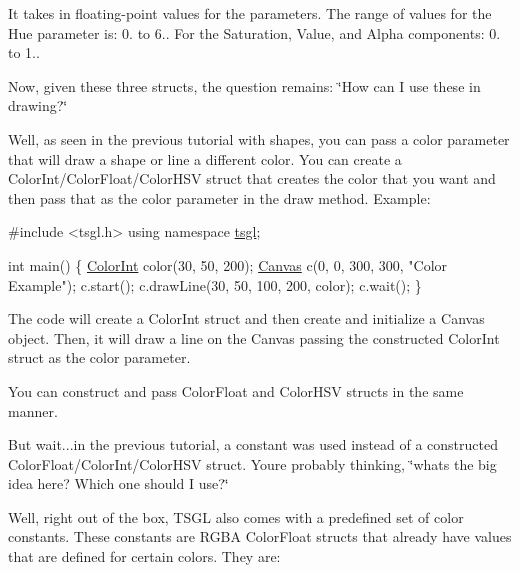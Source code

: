 It takes in floating-\/point values for the parameters. The range of values for the Hue parameter is\+: 0. to 6.. For the Saturation, Value, and Alpha components\+: 0. to 1..

Now, given these three structs, the question remains\+: \char`\"{}\+How can I use these in drawing?\char`\"{}

Well, as seen in the previous tutorial with shapes, you can pass a color parameter that will draw a shape or line a different color. You can create a Color\+Int/\+Color\+Float/\+Color\+H\+S\+V struct that creates the color that you want and then pass that as the color parameter in the draw method. Example\+:


\begin{DoxyCode}
\textcolor{preprocessor}{#include <tsgl.h>}
\textcolor{keyword}{using namespace }\hyperlink{namespacetsgl}{tsgl};

\textcolor{keywordtype}{int} main() \{
  \hyperlink{structtsgl_1_1_color_int}{ColorInt} color(30, 50, 200);
  \hyperlink{classtsgl_1_1_canvas}{Canvas} c(0, 0, 300, 300, \textcolor{stringliteral}{"Color Example"});
  c.start();
  c.drawLine(30, 50, 100, 200, color);
  c.wait();
\}
\end{DoxyCode}


The code will create a Color\+Int struct and then create and initialize a Canvas object. Then, it will draw a line on the Canvas passing the constructed Color\+Int struct as the color parameter.

You can construct and pass Color\+Float and Color\+H\+S\+V structs in the same manner.

But wait...in the previous tutorial, a constant was used instead of a constructed Color\+Float/\+Color\+Int/\+Color\+H\+S\+V struct. You\textquotesingle{}re probably thinking, \char`\"{}what\textquotesingle{}s the big idea here? Which one should I use?\char`\"{}

Well, right out of the box, T\+S\+G\+L also comes with a predefined set of color constants. These constants are R\+G\+B\+A Color\+Float structs that already have values that are defined for certain colors. They are\+:


